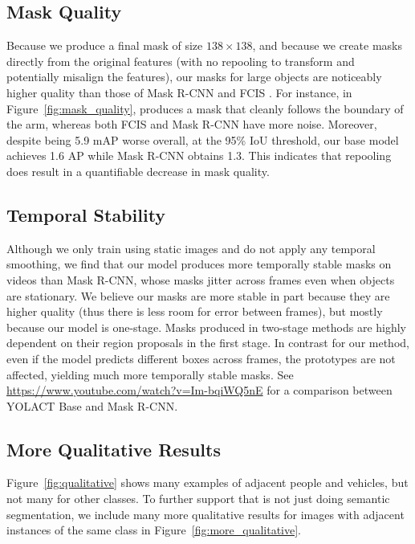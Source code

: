\documentclass[10pt,journal,compsoc]{IEEEtran}
\begin{document}
\subsection{Mask Quality} Because we produce a final mask of size $138 \times 138$, and because we create masks directly from the original features (with no repooling to transform and potentially misalign the features), our masks for large objects are noticeably higher quality than those of Mask R-CNN \cite{maskrcnn} and FCIS \cite{fcis}. For instance, in Figure~\ref{fig:mask_quality}, \methodname{} produces a mask that cleanly follows the boundary of the arm, whereas both FCIS and Mask R-CNN have more noise. Moreover, despite being 5.9 mAP worse overall, at the 95\% IoU threshold, our base model achieves 1.6 AP while Mask R-CNN obtains 1.3. This indicates that repooling does result in a quantifiable decrease in mask quality.




\subsection{Temporal Stability}
Although we only train using static images and do not apply any temporal smoothing, we find that our model produces more temporally stable masks on videos than Mask R-CNN, whose masks jitter across frames even when objects are stationary. We believe our masks are more stable in part because they are higher quality (thus there is less room for error between frames), but mostly because our model is one-stage. Masks produced in two-stage methods are highly dependent on their region proposals in the first stage. In contrast for our method, even if the model predicts different boxes across frames, the prototypes are not affected, yielding much more temporally stable masks. See \url{https://www.youtube.com/watch?v=Im-bqiWQ5nE} for a comparison between YOLACT Base and Mask R-CNN. 











\subsection{More Qualitative Results}
    Figure~\ref{fig:qualitative} shows many examples of adjacent people and vehicles, but not many for other classes. To further support that \methodname{} is not just doing semantic segmentation, we include many more qualitative results for images with adjacent instances of the same class in Figure~\ref{fig:more_qualitative}.
    
\end{document}
